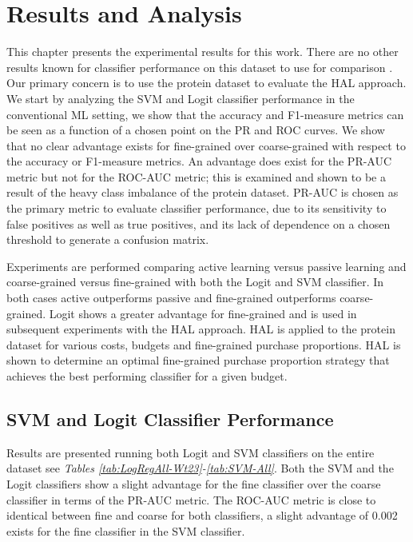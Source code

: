 \documentclass[ms]{nuthesis}
\begin{document}
\chapter{Results and Analysis}
\par This chapter presents the experimental results for this work. There are no other results known for classifier
 performance on this dataset to use for comparison \cite{bioPoster}. Our primary concern is to use the
 protein dataset to evaluate the HAL approach. We start by analyzing
 the SVM and Logit classifier performance in the conventional ML setting, we show that the
 accuracy and F1-measure metrics can be seen as a function of a chosen point on the PR and ROC curves.
 We show that no clear advantage exists for fine-grained over coarse-grained with respect to the accuracy
    or F1-measure metrics. An advantage does exist for the PR-AUC metric but not for the ROC-AUC metric; this
    is examined and shown to be a result of the heavy class imbalance of the protein dataset. PR-AUC is
    chosen as the primary metric to evaluate classifier performance, due to its sensitivity to false positives as
    well as true positives, and its lack of dependence on a chosen threshold to generate a confusion matrix.
    \par Experiments are performed comparing active learning versus passive learning and coarse-grained versus
    fine-grained with both the Logit and SVM classifier. In both cases active outperforms passive and fine-grained
    outperforms coarse-grained. Logit shows a greater advantage for fine-grained and is used in subsequent experiments
    with the HAL approach. HAL is applied to the protein dataset for various costs, budgets and
    fine-grained purchase proportions. HAL is shown to determine an optimal fine-grained purchase proportion
    strategy that achieves the best performing classifier for a given budget.

\section{SVM and Logit Classifier Performance}
\par Results are presented running both Logit and SVM classifiers on the entire dataset
see \textit{Tables \ref{tab:LogRegAll-Wt23}-\ref{tab:SVM-All}}.
Both the SVM and the Logit classifiers show a slight advantage for the fine
classifier over the coarse classifier in terms of the PR-AUC metric. The ROC-AUC
metric is close to identical between fine and coarse for both classifiers, a slight
advantage of 0.002 exists for the fine classifier in the SVM classifier.
\end{document}
